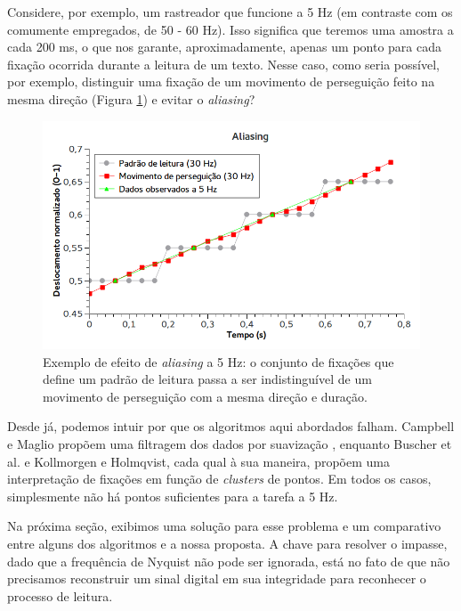 \documentclass[12pt]{article}
\begin{document}
		Considere, por exemplo, um rastreador que funcione a 5 Hz (em contraste com os comumente empregados, de 50 - 60 Hz). Isso significa que teremos uma amostra a cada 200 ms, o que nos garante, aproximadamente, apenas um ponto para cada fixação ocorrida durante a leitura de um texto. Nesse caso, como seria possível, por exemplo, distinguir uma fixação de um movimento de perseguição feito na mesma direção (Figura \ref{fig:aliasing_leitura}) e evitar o \textit{aliasing}?
		
		\begin{figure}[!ht]
			\centering
			\includegraphics[width=14cm]{imgs/aliasing_leitura.png}
			\caption{\footnotesize {Exemplo de efeito de \textit{aliasing} a 5 Hz: o conjunto de fixações que define um padrão de leitura passa a ser indistinguível de um movimento de perseguição com a mesma direção e duração.}}
			\label{fig:aliasing_leitura}
			\vspace{5mm}
		\end{figure}
		
		Desde já, podemos intuir por que os algoritmos aqui abordados falham. Campbell e Maglio propõem uma filtragem dos dados por suavização \cite{Campbell-2001}, enquanto Buscher et al. e Kollmorgen e Holmqvist, cada qual à sua maneira, propõem uma interpretação de fixações em função de \textit{clusters} de pontos\cite{Buscher-2008, Kollmorgen-2007}. Em todos os casos, simplesmente não há pontos suficientes para a tarefa a 5 Hz.
		
		Na próxima seção, exibimos uma solução para esse problema e um comparativo entre alguns dos algoritmos e a nossa proposta. A chave para resolver o impasse, dado que a frequência de Nyquist não pode ser ignorada, está no fato de que não precisamos reconstruir um sinal digital em sua integridade para reconhecer o processo de leitura.  
		
\end{document}
